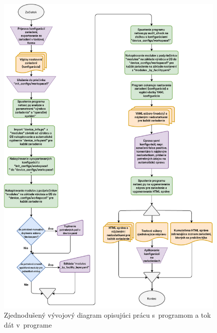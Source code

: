 \begin{figure}[H]
	\begin{center}
		\vspace*{-1cm}\includegraphics[scale=0.8]{obrazky/flowchart_navrh.pdf}
	\end{center}
	\caption[Vývojový diagram opisujúci prácu s~programom a tok dát v~programe]{Zjednodušený vývojový diagram opisujúci prácu s~programom a tok dát v~programe}
	\label{workflow}
\end{figure}

 

